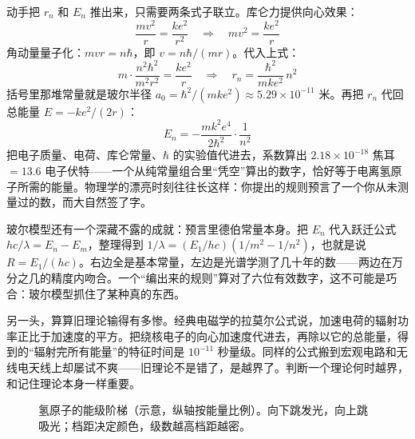 \begin{mathbridge}
动手把 \(r_{n}\) 和 \(E_{n}\) 推出来，只需要两条式子联立。库仑力提供向心效果：
\[
\frac{mv^{2}}{r}=\frac{ke^{2}}{r^{2}}\quad\Longrightarrow\quad mv^{2}=\frac{ke^{2}}{r}
\]
角动量量子化：\(mvr=n\hbar\)，即 \(v=n\hbar/(mr)\)。代入上式：
\[
m\cdot\frac{n^{2}\hbar^{2}}{m^{2}r^{2}}=\frac{ke^{2}}{r}\quad\Longrightarrow\quad r_{n}=\frac{\hbar^{2}}{mke^{2}}\,n^{2}
\]
括号里那堆常量就是玻尔半径 \(a_{0}=\hbar^{2}/(mke^{2})\approx5.29\times10^{-11}\) 米。再把 \(r_{n}\) 代回总能量 \(E=-ke^{2}/(2r)\)：
\[
E_{n}=-\frac{mk^{2}e^{4}}{2\hbar^{2}}\cdot\frac{1}{n^{2}}
\]
把电子质量、电荷、库仑常量、\(\hbar\) 的实验值代进去，系数算出 \(2.18\times10^{-18}\) 焦耳 \(=13.6\) 电子伏特——一个从纯常量组合里“凭空”算出的数字，恰好等于电离氢原子所需的能量。物理学的漂亮时刻往往长这样：你提出的规则预言了一个你从未测量过的数，而大自然签了字。
\end{mathbridge}

\begin{challenge}
玻尔模型还有一个深藏不露的成就：预言里德伯常量本身。把 \(E_{n}\) 代入跃迁公式 \(hc/\lambda=E_{n}-E_{m}\)，整理得到 \(1/\lambda=(E_{1}/hc)(1/m^{2}-1/n^{2})\)，也就是说 \(R=E_{1}/(hc)\)。右边全是基本常量，左边是光谱学测了几十年的数——两边在万分之几的精度内吻合。一个“编出来的规则”算对了六位有效数字，这不可能是巧合：玻尔模型抓住了某种真的东西。

另一头，算算旧理论输得有多惨。经典电磁学的拉莫尔公式说，加速电荷的辐射功率正比于加速度的平方。把绕核电子的向心加速度代进去，再除以它的总能量，得到的“辐射完所有能量”的特征时间是 \(10^{-11}\) 秒量级。同样的公式搬到宏观电路和无线电天线上却屡试不爽——旧理论不是错了，是越界了。判断一个理论何时越界，和记住理论本身一样重要。
\end{challenge}

\begin{figure}[htbp]
\centering
{}
\caption{氢原子的能级阶梯（示意，纵轴按能量比例）。向下跳发光，向上跳吸光；档距决定颜色，级数越高档距越密。}
\end{figure}

